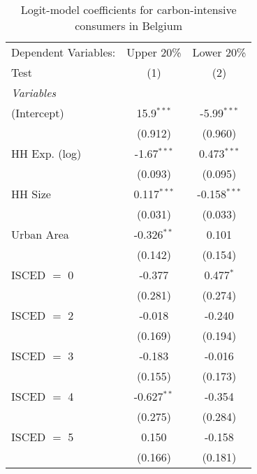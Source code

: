 
\begin{table}[htbp!]
   \centering
   \small
   \begin{adjustbox}{width = 1\textwidth, max height = 0.95\textheight, center}
      \begin{threeparttable}[b]
         \caption{\label{tab:Logit_1_BEL} Logit-model coefficients for carbon-intensive consumers in Belgium}
         \begin{tabular}{lcc}
            \tabularnewline \midrule \midrule
            Dependent Variables: & Upper 20\%    & Lower 20\%\\   
            Test                 & (1)           & (2)\\  
            \midrule
            \emph{Variables}\\
            (Intercept)          & 15.9$^{***}$  & -5.99$^{***}$\\   
                                 & (0.912)       & (0.960)\\   
            HH Exp. (log)        & -1.67$^{***}$ & 0.473$^{***}$\\   
                                 & (0.093)       & (0.095)\\   
            HH Size              & 0.117$^{***}$ & -0.158$^{***}$\\   
                                 & (0.031)       & (0.033)\\   
            Urban Area           & -0.326$^{**}$ & 0.101\\   
                                 & (0.142)       & (0.154)\\   
            ISCED $=$ 0          & -0.377        & 0.477$^{*}$\\   
                                 & (0.281)       & (0.274)\\   
            ISCED $=$ 2          & -0.018        & -0.240\\   
                                 & (0.169)       & (0.194)\\   
            ISCED $=$ 3          & -0.183        & -0.016\\   
                                 & (0.155)       & (0.173)\\   
            ISCED $=$ 4          & -0.627$^{**}$ & -0.354\\   
                                 & (0.275)       & (0.284)\\   
            ISCED $=$ 5          & 0.150         & -0.158\\   
                                 & (0.166)       & (0.181)\\   

\end{tabular}
\end{threeparttable}
\end{adjustbox}
\end{table}
